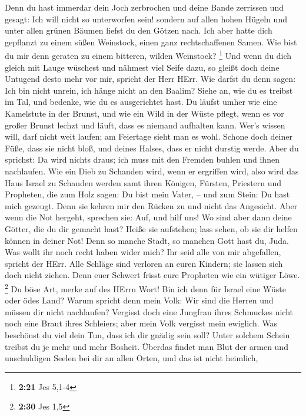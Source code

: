  Denn du hast immerdar dein Joch zerbrochen und deine Bande
zerrissen und gesagt: Ich will nicht so unterworfen sein! sondern auf
allen hohen Hügeln und unter allen grünen Bäumen liefst du den Götzen
nach.  Ich aber hatte dich gepflanzt zu einem süßen
Weinstock, einen ganz rechtschaffenen Samen. Wie bist du mir denn
geraten zu einem bitteren, wilden Weinstock? \footnote{\textbf{2:21} Jes
  5,1-4}  Und wenn du dich gleich mit Lauge wüschest und
nähmest viel Seife dazu, so gleißt doch deine Untugend desto mehr vor
mir, spricht der Herr HErr.  Wie darfst du denn sagen: Ich
bin nicht unrein, ich hänge nicht an den Baalim? Siehe an, wie du es
treibst im Tal, und bedenke, wie du es ausgerichtet hast. 
Du läufst umher wie eine Kamelstute in der Brunst, und wie ein Wild in
der Wüste pflegt, wenn es vor großer Brunst lechzt und läuft, dass es
niemand aufhalten kann. Wer's wissen will, darf nicht weit laufen; am
Feiertage sieht man es wohl.  Schone doch deiner Füße, dass
sie nicht bloß, und deines Halses, dass er nicht durstig werde. Aber du
sprichst: Da wird nichts draus; ich muss mit den Fremden buhlen und
ihnen nachlaufen.  Wie ein Dieb zu Schanden wird, wenn er
ergriffen wird, also wird das Haus Israel zu Schanden werden samt ihren
Königen, Fürsten, Priestern und Propheten,  die zum Holz
sagen: Du bist mein Vater, -- und zum Stein: Du hast mich gezeugt. Denn
sie kehren mir den Rücken zu und nicht das Angesicht. Aber wenn die Not
hergeht, sprechen sie: Auf, und hilf uns!  Wo sind aber
dann deine Götter, die du dir gemacht hast? Heiße sie aufstehen; lass
sehen, ob sie dir helfen können in deiner Not! Denn so manche Stadt, so
manchen Gott hast du, Juda.  Was wollt ihr noch recht haben
wider mich? Ihr seid alle von mir abgefallen, spricht der HErr.
 Alle Schläge sind verloren an euren Kindern; sie lassen
sich doch nicht ziehen. Denn euer Schwert frisst eure Propheten wie ein
wütiger Löwe. \footnote{\textbf{2:30} Jes 1,5}  Du böse
Art, merke auf des HErrn Wort! Bin ich denn für Israel eine Wüste oder
ödes Land? Warum spricht denn mein Volk: Wir sind die Herren und müssen
dir nicht nachlaufen?  Vergisst doch eine Jungfrau ihres
Schmuckes nicht noch eine Braut ihres Schleiers; aber mein Volk vergisst
mein ewiglich.  Was beschönst du viel dein Tun, dass ich
dir gnädig sein soll? Unter solchem Schein treibst du je mehr und mehr
Bosheit.  Überdas findet man Blut der armen und
unschuldigen Seelen bei dir an allen Orten, und das ist nicht heimlich,
